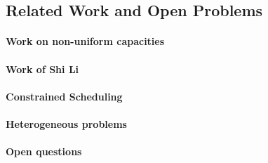 \subsection{Related Work and Open Problems}\label{sec:related}
\paragraph{Work on non-uniform capacities}
\paragraph{Work of Shi Li}
\paragraph{Constrained Scheduling}
\paragraph{Heterogeneous problems}
\paragraph{Open questions}


